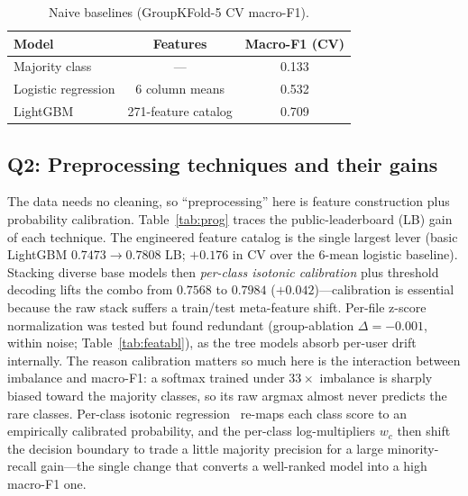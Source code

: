 \documentclass[conference]{IEEEtran}
\begin{document}
\begin{table}[t]
\caption{Naive baselines (GroupKFold-5 CV macro-F1).}
\label{tab:base}
\centering
\begin{tabular}{l c c}
\hline
\textbf{Model} & \textbf{Features} & \textbf{Macro-F1 (CV)}\\
\hline
Majority class & --- & 0.133 \\
Logistic regression & 6 column means & 0.532 \\
LightGBM & 271-feature catalog & 0.709 \\
\hline
\end{tabular}
\end{table}

\subsection{Q2: Preprocessing techniques and their gains}
The data needs no cleaning, so ``preprocessing'' here is feature construction plus probability calibration.
Table~\ref{tab:prog} traces the public-leaderboard (LB) gain of each technique. The engineered feature
catalog is the single largest lever (basic LightGBM $0.7473\!\rightarrow\!0.7808$ LB; $+0.176$ in CV over the
6-mean logistic baseline). Stacking diverse base models then \emph{per-class isotonic calibration} plus
threshold decoding lifts the combo from $0.7568$ to $0.7984$ ($+0.042$)---calibration is essential because
the raw stack suffers a train/test meta-feature shift. Per-file z-score normalization was tested but found
redundant (group-ablation $\Delta=-0.001$, within noise; Table~\ref{tab:featabl}), as the tree models absorb
per-user drift internally. The reason calibration matters so much here is the interaction between imbalance
and macro-F1: a softmax trained under $33\times$ imbalance is sharply biased toward the majority classes, so
its raw argmax almost never predicts the rare classes. Per-class isotonic regression~\cite{zadrozny2002transforming}
re-maps each class score to an empirically calibrated probability, and the per-class log-multipliers $w_c$
then shift the decision boundary to trade a little majority precision for a large minority-recall gain---the
single change that converts a well-ranked model into a high macro-F1 one.
\end{document}
